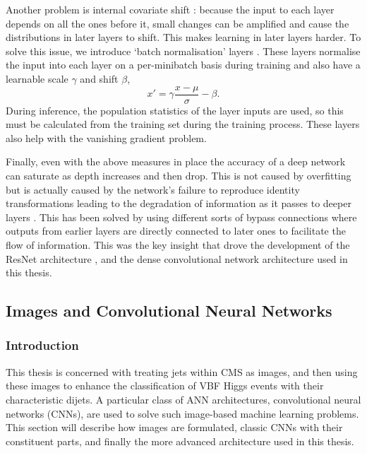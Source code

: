 Another problem is internal covariate shift \cite{BatchNorm}: because the input to each layer depends on all the ones before it, small changes can be amplified and cause the distributions in later layers to shift. This makes learning in later layers harder. 
To solve this issue, we introduce `batch normalisation' layers \cite{BatchNorm}. These layers normalise the input into each layer on a per-minibatch basis during training and also have a learnable scale $\gamma$ and shift $\beta$,
\begin{equation}
    x{'}=\gamma\frac{x-\mu}{\sigma} - \beta.
\end{equation}
During inference, the population statistics of the layer inputs are used, so this must be calculated from the training set during the training process. These layers also help with the vanishing gradient problem. 

Finally, even with the above measures in place the accuracy of a deep network can saturate as depth increases and then drop. This is not caused by overfitting but is actually caused by the network's failure to reproduce identity transformations leading to the degradation of information as it passes to deeper layers \cite{ResNet}. This has been solved by using different sorts of bypass connections where outputs from earlier layers are directly connected to later ones to facilitate the flow of information. This was the key insight that drove the development of the ResNet architecture \cite{ResNet}, and the dense convolutional network architecture used in this thesis.  


\subsection{Images and Convolutional Neural Networks}

\subsubsection{Introduction}
This thesis is concerned with treating jets within CMS as images, and then using these images to enhance the classification of VBF Higgs events with their characteristic dijets. 
A particular class of ANN architectures, convolutional neural networks (CNNs), are used to solve such image-based machine learning problems.
This section will describe how images are formulated, classic CNNs with their constituent parts, and finally the more advanced architecture used in this thesis. 


